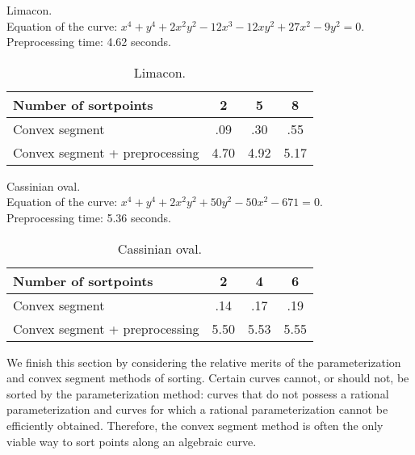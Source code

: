 \begin{example}
\label{eg-limacon}
{\samepage
Limacon.\\
\indent Equation of the curve: $x^{4} + y^{4} + 2x^{2}y^{2} - 12x^{3} - 12xy^{2} + 
	27x^{2} - 9y^{2} = 0$.\\
\indent Preprocessing time: 4.62 seconds.

}
\begin{table}[htbp]
\caption{Limacon.}
\begin{center}
\begin{tabular}{|l|c|c|c|} \hline
Number of sortpoints & 2 & 5 & 8 \\ \hline \hline
Convex segment & .09 & .30 & .55 \\ \hline
Convex segment + preprocessing & 4.70 & 4.92 & 5.17 \\ \hline
\end{tabular}
\end{center}
\end{table}
\end{example}

\begin{example}
\label{eg-Cassinian}
{\samepage
Cassinian oval.\\
\indent Equation of the curve: $x^{4} + y^{4} + 2x^{2}y^{2} + 50y^{2} - 50x^{2}-671 = 0$.\\
\indent Preprocessing time: 5.36 seconds.

}
\begin{table}[htbp]
\caption{Cassinian oval.}
\begin{center}
\begin{tabular}{|l|c|c|c|} \hline
Number of sortpoints & 2 & 4 & 6 \\ \hline \hline
Convex segment & .14 & .17 & .19 \\ \hline
Convex segment + preprocessing & 5.50 & 5.53 & 5.55 \\ \hline
\end{tabular}
\end{center}
\end{table}
\end{example}

\vspace{.2in}

We finish this section by considering the relative merits of the parameterization and 
convex segment methods of sorting.
Certain curves cannot, or should 
not, be sorted by the parameterization method: curves that 
do not possess a rational parameterization and curves for which
a rational parameterization cannot be efficiently obtained.
Therefore, the convex segment method is often 
the only viable way to sort points along an algebraic curve.

